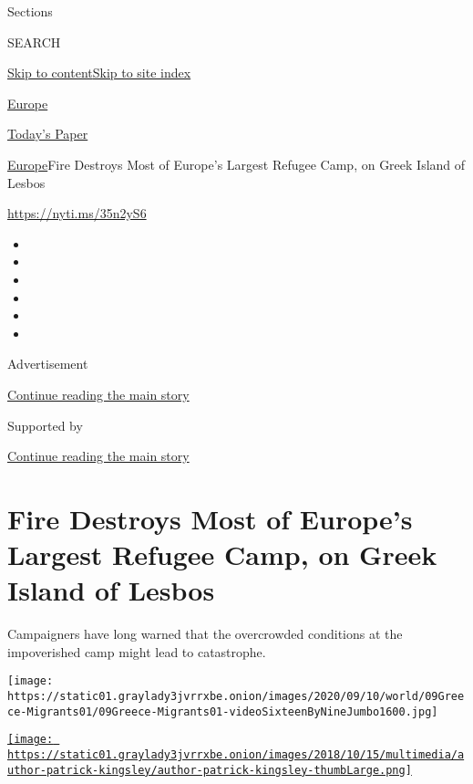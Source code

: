 Sections

SEARCH

\protect\hyperlink{site-content}{Skip to
content}\protect\hyperlink{site-index}{Skip to site index}

\href{https://www.nytimes3xbfgragh.onion/section/world/europe}{Europe}

\href{https://myaccount.nytimes3xbfgragh.onion/auth/login?response_type=cookie\&client_id=vi}{}

\href{https://www.nytimes3xbfgragh.onion/section/todayspaper}{Today's
Paper}

\href{/section/world/europe}{Europe}\textbar{}Fire Destroys Most of
Europe's Largest Refugee Camp, on Greek Island of Lesbos

\url{https://nyti.ms/35n2yS6}

\begin{itemize}
\item
\item
\item
\item
\item
\item
\end{itemize}

Advertisement

\protect\hyperlink{after-top}{Continue reading the main story}

Supported by

\protect\hyperlink{after-sponsor}{Continue reading the main story}

\hypertarget{fire-destroys-most-of-europes-largest-refugee-camp-on-greek-island-of-lesbos}{%
\section{Fire Destroys Most of Europe's Largest Refugee Camp, on Greek
Island of
Lesbos}\label{fire-destroys-most-of-europes-largest-refugee-camp-on-greek-island-of-lesbos}}

Campaigners have long warned that the overcrowded conditions at the
impoverished camp might lead to catastrophe.

\texttt{[image: https://static01.graylady3jvrrxbe.onion/images/2020/09/10/world/09Greece-Migrants01/09Greece-Migrants01-videoSixteenByNineJumbo1600.jpg]}

\href{https://www.nytimes3xbfgragh.onion/by/patrick-kingsley}{\texttt{[image: https://static01.graylady3jvrrxbe.onion/images/2018/10/15/multimedia/author-patrick-kingsley/author-patrick-kingsley-thumbLarge.png]}}

